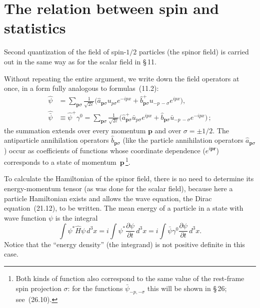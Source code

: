 \section{The relation between spin and statistics}

Second quantization of the field of spin-$1/2$ particles (the spinor field) is carried out in the same way as for the scalar field in \S\,11.

Without repeating the entire argument, we write down the field operators at once, in a form fully analogous to formulas~(11.2):
\begin{equation}
\begin{aligned}
\widehat\psi &= \sum_{\mathbf{p}\sigma}\frac{1}{\sqrt{2\varepsilon}}\bigl(\widehat a_{\mathbf{p}\sigma}u_{p\sigma}e^{-ipx} + \widehat b^+_{\mathbf{p}\sigma}u_{-p\,-\sigma}e^{ipx}\bigr),\\
\widehat{\bar\psi} &\equiv \widehat\psi^+\gamma^0 = \sum_{\mathbf{p}\sigma}\frac{1}{\sqrt{2\varepsilon}}\bigl(\widehat a^+_{\mathbf{p}\sigma}\bar u_{p\sigma}e^{ipx} + \widehat b_{\mathbf{p}\sigma}\bar u_{-p\,-\sigma}e^{-ipx}\bigr)\,;
\end{aligned}
\tag{25.1}
\end{equation}
the summation extends over every momentum $\mathbf{p}$ and over $\sigma = \pm 1/2$. The antiparticle annihilation operators $\widehat b_{\mathbf{p}\sigma}$ (like the particle annihilation operators $\widehat a_{\mathbf{p}\sigma}$) occur as coefficients of functions whose coordinate dependence ($e^{i\mathbf{pr}}$) corresponds to a state of momentum~$\mathbf{p}$\,\footnote{Both kinds of function also correspond to the same value of the rest-frame spin projection $\sigma$: for the functions $\bar\psi_{-p,-\sigma}$ this will be shown in \S\,26; see~(26.10).}.

To calculate the Hamiltonian of the spinor field, there is no need to determine its energy-momentum tensor (as was done for the scalar field), because here a particle Hamiltonian exists and allows the wave equation, the Dirac equation~(21.12), to be written. The mean energy of a particle in a state with wave function $\psi$ is the integral
\begin{equation}
\int \psi^*\widehat H\psi\,d^3x = i\int \psi^*\frac{\partial\psi}{\partial t}\,d^3x = i\int \bar\psi\gamma^0\frac{\partial\psi}{\partial t}\,d^3x.
\tag{25.2}
\end{equation}
Notice that the ``energy density'' (the integrand) is not positive definite in this case.

